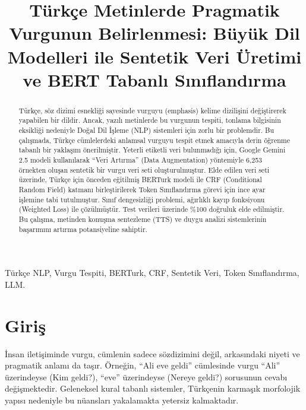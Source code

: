 \documentclass[conference]{IEEEtran}
\begin{document}
\title{Türkçe Metinlerde Pragmatik Vurgunun Belirlenmesi: Büyük Dil Modelleri ile Sentetik Veri Üretimi ve BERT Tabanlı Sınıflandırma}

\author{
\and
{}
}

\maketitle

\begin{abstract}
Türkçe, söz dizimi esnekliği sayesinde vurguyu (emphasis) kelime dizilişini değiştirerek yapabilen bir dildir. Ancak, yazılı metinlerde bu vurgunun tespiti, tonlama bilgisinin eksikliği nedeniyle Doğal Dil İşleme (NLP) sistemleri için zorlu bir problemdir. Bu çalışmada, Türkçe cümlelerdeki anlamsal vurguyu tespit etmek amacıyla derin öğrenme tabanlı bir yaklaşım önerilmiştir. Yeterli etiketli veri bulunmadığı için, Google Gemini 2.5 modeli kullanılarak ``Veri Artırma'' (Data Augmentation) yöntemiyle 6,253 örnekten oluşan sentetik bir vurgu veri seti oluşturulmuştur. Elde edilen veri seti üzerinde, Türkçe için önceden eğitilmiş BERTurk modeli ile CRF (Conditional Random Field) katmanı birleştirilerek Token Sınıflandırma görevi için ince ayar işlemine tabi tutulmuştur. Sınıf dengesizliği problemi, ağırlıklı kayıp fonksiyonu (Weighted Loss) ile çözülmüştür. Test verileri üzerinde \%100 doğruluk elde edilmiştir. Bu çalışma, metinden konuşma sentezleme (TTS) ve duygu analizi sistemlerinin başarımını artırma potansiyeline sahiptir.
\end{abstract}

\begin{IEEEkeywords}
Türkçe NLP, Vurgu Tespiti, BERTurk, CRF, Sentetik Veri, Token Sınıflandırma, LLM.
\end{IEEEkeywords}

\section{Giriş}
İnsan iletişiminde vurgu, cümlenin sadece sözdizimini değil, arkasındaki niyeti ve pragmatik anlamı da taşır. Örneğin, ``Ali eve geldi'' cümlesinde vurgu ``Ali'' üzerindeyse (Kim geldi?), ``eve'' üzerindeyse (Nereye geldi?) sorusunun cevabı değişmektedir. Geleneksel kural tabanlı sistemler, Türkçenin karmaşık morfolojik yapısı nedeniyle bu nüansları yakalamakta yetersiz kalmaktadır.
\end{document}
